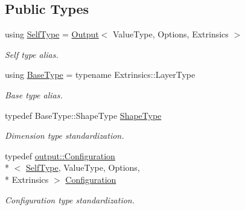 \subsection*{Public Types}
\begin{DoxyCompactItemize}
\item 
using \hyperlink{classffnn_1_1layer_1_1_output_a372fcfc142bc62cb466ad6b5a4feeaa2}{Self\-Type} = \hyperlink{classffnn_1_1layer_1_1_output}{Output}$<$ Value\-Type, Options, Extrinsics $>$
\begin{DoxyCompactList}\small\item\em Self type alias. \end{DoxyCompactList}\item 
using \hyperlink{classffnn_1_1layer_1_1_output_a9f60142c3e464fcc6cda5203895dc448}{Base\-Type} = typename Extrinsics\-::\-Layer\-Type
\begin{DoxyCompactList}\small\item\em Base type alias. \end{DoxyCompactList}\item 
typedef Base\-Type\-::\-Shape\-Type \hyperlink{classffnn_1_1layer_1_1_output_a8755e7ce13c1b45243a679a5a5376ee4}{Shape\-Type}
\begin{DoxyCompactList}\small\item\em Dimension type standardization. \end{DoxyCompactList}\item 
typedef \hyperlink{classffnn_1_1layer_1_1output_1_1_configuration}{output\-::\-Configuration}\\*
$<$ \hyperlink{classffnn_1_1layer_1_1_output_a372fcfc142bc62cb466ad6b5a4feeaa2}{Self\-Type}, Value\-Type, Options, \\*
Extrinsics $>$ \hyperlink{classffnn_1_1layer_1_1_output_a9e57e6ca1764925cea614e32886a1568}{Configuration}
\begin{DoxyCompactList}\small\item\em Configuration type standardization. \end{DoxyCompactList}\end{DoxyCompactItemize}
